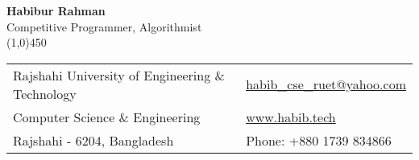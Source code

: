 \documentclass[letterpaper,11pt,oneside]{article}
\begin{document}

\center  \LARGE{\textbf{Habibur Rahman}} \\ \small{Competitive Programmer, Algorithmist} \\
\vspace{-1ex}
{\line(1,0){450}}
\normalsize


\begin{center}
\begin{tabular}{l l}
 Rajshahi University of Engineering \& Technology    & \hspace{1in} \href{mailto:habib_cse_ruet@yahoo.com}{habib\_cse\_ruet@yahoo.com} \\
 Computer Science \& Engineering    & \hspace{1in}  \href{www.habib.tech}{www.habib.tech}   \\
           
 Rajshahi - 6204, Bangladesh & \hspace{1in} Phone: +880 1739 834866 \\
\end{tabular}
\end{center}

\vspace{1em}

\end{document}
